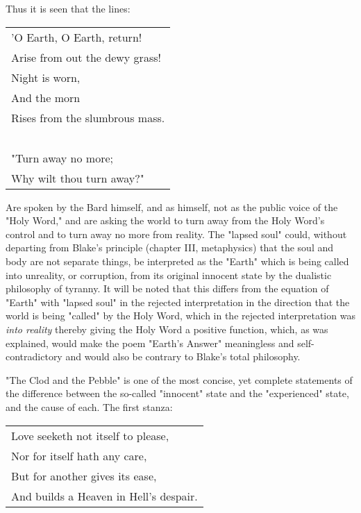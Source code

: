 \hspace*{5mm}Thus it is seen that the lines:\par
\begin{center}
	\begin{tabular}{l}
		'O Earth, O Earth, return!     \\
		Arise from out the dewy grass! \\
		Night is worn,                 \\
		And the morn                   \\
		Rises from the slumbrous mass. \\
		~                              \\
		"Turn away no more;            \\
		Why wilt thou turn away?"
	\end{tabular}
\end{center}
Are spoken by the Bard himself, and as himself, not as the public voice
of the "Holy Word," and are asking the world to turn away from the Holy Word's
control and to turn away no more from reality. The "lapsed soul" could, without departing
from Blake's principle (chapter III, metaphysics) that the soul and body are not separate
things, be interpreted as the "Earth" which is being called into unreality, or corruption, from 
its original innocent state by the dualistic philosophy of tyranny. It will be noted that this 
differs from the equation of "Earth" with "lapsed soul" in the rejected interpretation in the 
direction that the world is being "called" by the Holy Word, which in the rejected interpretation
was \textit{into reality} thereby giving the Holy Word a positive function, which, as was explained,
would make the poem "Earth's Answer" meaningless and self-contradictory and would also be contrary 
to Blake's total philosophy.\par
\vspace*{0.5\baselineskip}
"The Clod and the Pebble" is one of the most concise, yet complete statements of the difference between the 
so-called "innocent" state and the "experienced" state, and the cause of each. The first stanza:\par
\begin{center}
	\begin{tabular}{l}
		Love seeketh not itself to please, \\
		Nor for itself hath any care,      \\
		But for another gives its ease,    \\
		And builds a Heaven in Hell's despair.
	\end{tabular}
\end{center}
